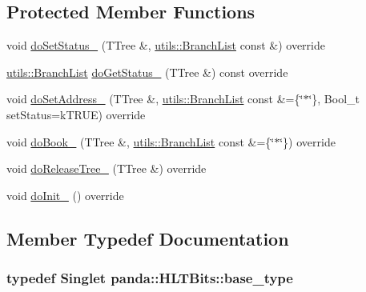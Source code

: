 \subsection*{Protected Member Functions}
\begin{DoxyCompactItemize}
\item 
void \hyperlink{classpanda_1_1HLTBits_ae031e46f650668194269fec06b95ef72}{doSetStatus\_\-} (TTree \&, \hyperlink{classpanda_1_1utils_1_1BranchList}{utils::BranchList} const \&) override
\item 
\hyperlink{classpanda_1_1utils_1_1BranchList}{utils::BranchList} \hyperlink{classpanda_1_1HLTBits_a25f37a9baf25b848fb303f8d08daa027}{doGetStatus\_\-} (TTree \&) const override
\item 
void \hyperlink{classpanda_1_1HLTBits_a97318f3a21281121aa78a84c3c9027af}{doSetAddress\_\-} (TTree \&, \hyperlink{classpanda_1_1utils_1_1BranchList}{utils::BranchList} const \&=\{\char`\"{}$\ast$\char`\"{}\}, Bool\_\-t setStatus=kTRUE) override
\item 
void \hyperlink{classpanda_1_1HLTBits_a9ed1eb7a9deebf34f8d9458dbf021407}{doBook\_\-} (TTree \&, \hyperlink{classpanda_1_1utils_1_1BranchList}{utils::BranchList} const \&=\{\char`\"{}$\ast$\char`\"{}\}) override
\item 
void \hyperlink{classpanda_1_1HLTBits_aa18c8ff3c69a7ab522df688d5680dcdd}{doReleaseTree\_\-} (TTree \&) override
\item 
void \hyperlink{classpanda_1_1HLTBits_a6851af7cebb5cb7a09aa7a76d42e5848}{doInit\_\-} () override
\end{DoxyCompactItemize}


\subsection{Member Typedef Documentation}
\hypertarget{classpanda_1_1HLTBits_a0b3fb69a61a8c9ec407a7c066d40f5dc}{
\subsubsection[{base\_\-type}]{\setlength{\rightskip}{0pt plus 5cm}typedef {\bf Singlet} {\bf panda::HLTBits::base\_\-type}}}
\label{classpanda_1_1HLTBits_a0b3fb69a61a8c9ec407a7c066d40f5dc}


